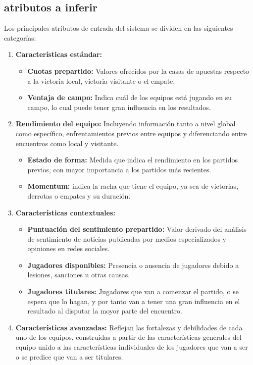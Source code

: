\subsection{atributos a inferir}

Los principales atributos de entrada del sistema se dividen en las siguientes categorías:

\begin{enumerate}
    \item \textbf{Características estándar:}
        \begin{itemize}
            \item \textbf{Cuotas prepartido:} Valores ofrecidos por la casas de apuestas respecto a la victoria local, victoria visitante o el empate.
            \item \textbf{Ventaja de campo:} Indica cuál de los equipos está jugando en su campo, lo cual puede tener gran influencia en los resultados.
        \end{itemize}
    \item \textbf{Rendimiento del equipo:} Incluyendo información tanto a nivel global como específico, enfrentamientos previos entre equipos y diferenciando entre encuentros como local y visitante.
    \begin{itemize}
        \item \textbf{Estado de forma:} Medida que indica el rendimiento en los partidos previos, con mayor importancia a los partidos más recientes.
        \item \textbf{Momentum:} indica la racha que tiene el equipo, ya sea de victorias, derrotas o empates y su duración.
    \end{itemize}
    \item \textbf{Características contextuales:}
    \begin{itemize}
        \item \textbf{Puntuación del sentimiento prepartido:} Valor derivado del análisis de sentimiento de noticias publicadas por medios especializados y opiniones en redes sociales.
        \item \textbf{Jugadores disponibles:} Presencia o ausencia de jugadores debido a lesiones, sanciones u otras causas.
        \item \textbf{Jugadores titulares:} Jugadores que van a comenzar el partido, o se espera que lo hagan, y por tanto van a tener una gran influencia en el resultado al disputar la moyor parte del encuentro.
    \end{itemize}
    \item \textbf{Características avanzadas:} Reflejan las fortalezas y debilidades de cada uno de los equipos, construidas a partir de las características generales del equipo unido a las características individuales de los jugadores que van a ser o se predice que van a ser titulares.

\end{enumerate}
